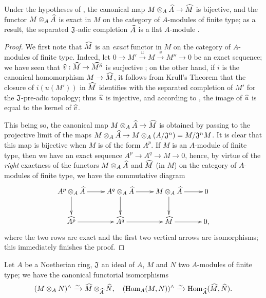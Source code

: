 \begin{cor}[7.3.3]
\label{0.7.3.3}
Under the hypotheses of , the canonical map
$M\otimes_A\wh{A}\to\wh{M}$ is bijective, and the functor $M\otimes_A\widehat{A}$
is exact in $M$ on the category of $A$-modules of finite type; as a result, the separated
$\mathfrak{J}$-adic completion $\widehat{A}$ is a flat $A$-module
.
\end{cor}

\begin{proof}
\label{proof-0.7.3.3}
We first note that $\widehat{M}$ is an \emph{exact} functor in $M$ on the category of
$A$-modules of finite type. Indeed, let $0\to M'\xrightarrow{u}M\xrightarrow{v}M''\to 0$ be
an exact sequence; we have seen that $\wh{v}:\wh{M}\to\wh{M''}$ is surjective
; on the other hand, if $i$ is the canonical homomorphism
$M\to\wh{M}$, it follows from Krull's Theorem  that the
closure of $i(u(M'))$ in $\widehat{M}$ identifies with the separated completion of $M'$ for
the $\mathfrak{J}$-pre-adic topology; thus $\widehat{u}$ is injective, and according to
, the image of $\widehat{u}$ is equal to the kernel of
$\widehat{v}$.

This being so, the canonical map $M\otimes_A\wh{A}\to\wh{M}$ is obtained by passing
to the projective limit of the maps
$M\otimes_A\wh{A}\to M\otimes_A(A/\fk{J}^n)=M/\fk{J}^n M$. It is clear that
this map is bijective when $M$ is of the form $A^p$. If $M$ is an $A$-module of finite type,
then we have an exact sequence $A^p\to A^q\to M\to 0$, hence, by virtue of the \emph{right}
exactness of the functors $M\otimes_A\widehat{A}$ and $\widehat{M}$ (in $M$) on the category
of $A$-modules of finite type, we have the commutative diagram
\[
  \xymatrix{
    A^p\otimes_A\wh{A}\ar[r]\ar[d] &
    A^q\otimes_A\wh{A}\ar[r]\ar[d] &
    M\otimes_A\wh{A}\ar[r]\ar[d] &
    0\\
    \wh{A^p}\ar[r] &
    \wh{A^q}\ar[r] &
    \wh{M}\ar[r] &
    0,
  }
\]
where the two rows are exact and the first two vertical arrows are isomorphisms; this
immediately finishes the proof.
\end{proof}

\begin{cor}[7.3.4]
\label{0.7.3.4}
Let $A$ be a Noetherian ring, $\mathfrak{J}$ an ideal of $A$, $M$ and $N$ two $A$-modules of
finite type; we have the canonical functorial isomorphisms
\[
  (M\otimes_A N)^\wedge\xrightarrow{\sim}\widehat{M}\otimes_{\widehat{A}}\widehat{N},
  \quad
  ({\mathop{\mathrm{Hom}}\nolimits}_A(M,N))^\wedge\xrightarrow{\sim}{\mathop{\mathrm{Hom}}\nolimits}_{\widehat{A}}(\widehat{M},\widehat{N}).
\]
\end{cor}

